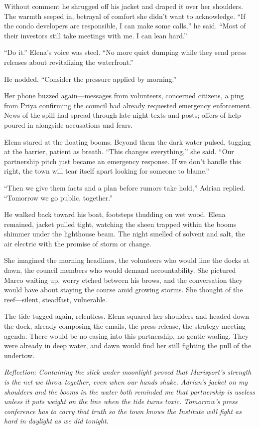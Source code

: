 Without comment he shrugged off his jacket and draped it over her shoulders. The warmth seeped in, betrayal of comfort she didn’t want to acknowledge. “If the condo developers are responsible, I can make some calls,” he said. “Most of their investors still take meetings with me. I can lean hard.”

“Do it.” Elena’s voice was steel. “No more quiet dumping while they send press releases about revitalizing the waterfront.”

He nodded. “Consider the pressure applied by morning.”

Her phone buzzed again—messages from volunteers, concerned citizens, a ping from Priya confirming the council had already requested emergency enforcement. News of the spill had spread through late-night texts and posts; offers of help poured in alongside accusations and fears.

Elena stared at the floating booms. Beyond them the dark water pulsed, tugging at the barrier, patient as breath. “This changes everything,” she said. “Our partnership pitch just became an emergency response. If we don’t handle this right, the town will tear itself apart looking for someone to blame.”

“Then we give them facts and a plan before rumors take hold,” Adrian replied. “Tomorrow we go public, together.”

He walked back toward his boat, footsteps thudding on wet wood. Elena remained, jacket pulled tight, watching the sheen trapped within the booms shimmer under the lighthouse beam. The night smelled of solvent and salt, the air electric with the promise of storm or change.

She imagined the morning headlines, the volunteers who would line the docks at dawn, the council members who would demand accountability. She pictured Marco waiting up, worry etched between his brows, and the conversation they would have about staying the course amid growing storms. She thought of the reef—silent, steadfast, vulnerable.

The tide tugged again, relentless. Elena squared her shoulders and headed down the dock, already composing the emails, the press release, the strategy meeting agenda. There would be no easing into this partnership, no gentle wading. They were already in deep water, and dawn would find her still fighting the pull of the undertow.

\noindent\textit{Reflection: Containing the slick under moonlight proved that Marisport's strength is the net we throw together, even when our hands shake. Adrian's jacket on my shoulders and the booms in the water both reminded me that partnership is useless unless it puts weight on the line when the tide turns toxic. Tomorrow's press conference has to carry that truth so the town knows the Institute will fight as hard in daylight as we did tonight.}
